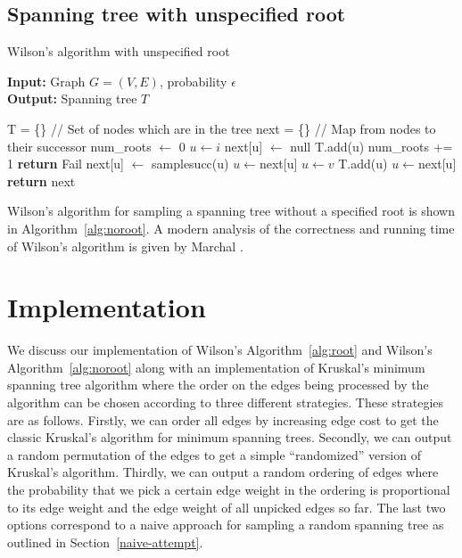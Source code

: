 \documentclass[11pt]{article}
\begin{document}
\subsection{Spanning tree with unspecified root}
\begin{algorithm}
\caption{Wilson's algorithm with unspecified root}
\label{alg:noroot}
\textbf{Input: }Graph $G=(V,E)$, probability $\epsilon$ \\
\textbf{Output: }Spanning tree $T$
\begin{algorithmic}
\STATE T = \{\}                   // Set of nodes which are in the tree
\STATE next = \{\}                // Map from nodes to their successor
\STATE num\_roots $\leftarrow$ 0
\STATE $u \leftarrow i$
\STATE next[u] $\leftarrow$ null
\STATE T.add(u)
\STATE num\_roots += 1
\STATE \textbf{return} Fail
\ENDIF
\ELSE
\STATE next[u] $\leftarrow$ samplesucc(u)
\STATE $u \leftarrow $next[u]
\ENDIF
\STATE $u \leftarrow v$
\ENDWHILE
{} \label{adjoin2}
\STATE T.add(u)
\STATE $u \leftarrow $next[u]
\ENDWHILE
\ENDFOR
\STATE \textbf{return} next
\end{algorithmic}
\end{algorithm}

Wilson's algorithm for sampling a spanning tree without a specified root is
shown in Algorithm~\ref{alg:noroot}.
A modern analysis of the correctness and running time of Wilson's algorithm is
given by Marchal \cite{marchal}.

\section{Implementation}\label{imp}

We discuss our implementation of Wilson's Algorithm~\ref{alg:root} and Wilson's Algorithm~\ref{alg:noroot} along with an implementation of Kruskal's minimum spanning tree algorithm where the order on the edges being processed by the algorithm can be chosen according to three different strategies. These strategies are as follows. Firstly, we can order all edges by increasing edge cost to get the classic Kruskal's algorithm for minimum spanning trees. Secondly, we can output a random permutation of the edges to get a simple ``randomized'' version of Kruskal's algorithm. Thirdly, we can output a random ordering of edges where the probability that we pick a certain edge weight in the ordering is proportional to its edge weight and the edge weight of all unpicked edges so far. The last two options correspond to a naive approach for sampling a random spanning tree as outlined in Section~\ref{naive-attempt}.
\end{document}
